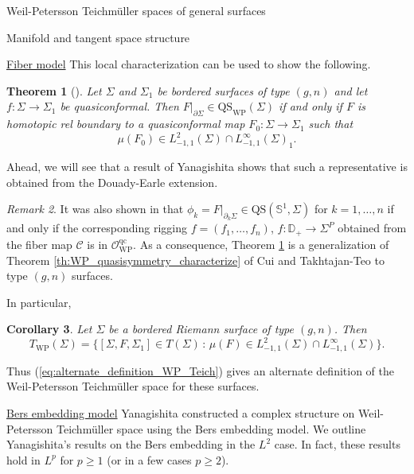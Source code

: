 \documentclass[12pt]{amsart}
\newcommand{\disk}{\ensuremath{\mathbb{D}} } %
\newcommand{\riem}{\Sigma}  %
\theoremstyle{plain}
\newtheorem{theorem}{Theorem}[section]
\newtheorem{corollary}[theorem]{Corollary}
\theoremstyle{definition}
\theoremstyle{remark}
\newtheorem{remark}[theorem]{Remark}
\numberwithin{equation}{section} %
\numberwithin{figure}{section} %
\begin{document}
\begin{section}{Weil-Petersson Teichm\"uller spaces of general surfaces}
\begin{subsection}{Manifold and tangent space structure}
\begin{subsubsection}{{\underline{Fiber model}}}
This local characterization can be used to show the following. 
\begin{theorem}[\cite{RSS_WP1}] \label{th:us_WP_homotopy_characterize}
 Let $\riem$ and $\riem_1$ be bordered surfaces of type $(g,n)$ and let $f:\riem \rightarrow \riem_1$ be quasiconformal.  Then $\left. F \right|_{\partial \riem} \in \mathrm{QS}_{\mathrm{WP}}(\riem)$ if and only if $F$ is homotopic rel boundary to a quasiconformal map $F_0:\riem \rightarrow \riem_1$ such that 
 \[ \mu(F_0) \in L^2_{-1,1}(\riem) \cap L^\infty_{-1,1}(\riem)_1. \]
\end{theorem}
Ahead, we will see that a result of Yanagishita shows that such a representative is obtained from the Douady-Earle extension.

\begin{remark} \label{re:Cuis_characterization_extended_us} It was also shown in \cite{RSS_WP_arxiv,RSS_WP2} that 
 $\phi_k = \left. F \right|_{\partial_k \riem} \in \mathrm{QS}(\mathbb{S}^1,\riem)$ for $k=1,\ldots,n$ if and only if the corresponding rigging $f = (f_1,\ldots,f_n)$, $f:\disk_+\rightarrow \riem^P$ obtained from the fiber map $\mathcal{C}$ is in $\mathcal{O}_{\mathrm{WP}}^{\mathrm{qc}}$. As a consequence, Theorem \ref{th:us_WP_homotopy_characterize} is a generalization of Theorem \ref{th:WP_quasisymmetry_characterize} of Cui and Takhtajan-Teo to type $(g,n)$ surfaces.  
\end{remark}

In particular, 
\begin{corollary} \cite{RSS_WP_arxiv,RSS_WP1} \label{co:WP_Teich_recharacterize_us}
 Let $\riem$ be a bordered Riemann surface of type $(g,n)$. Then
 \begin{equation} \label{eq:alternate_definition_WP_Teich}
  T_{\mathrm{WP}}(\riem) = \{ [\riem,F,\riem_1] \in T(\riem) \,:\, \mu(F) \in L^2_{-1,1}(\riem) \cap L^\infty_{-1,1}(\riem) \}. 
 \end{equation}
\end{corollary}
Thus (\ref{eq:alternate_definition_WP_Teich}) gives an alternate definition of the Weil-Petersson Teichm\"uller space for these surfaces. 


\end{subsubsection}
\begin{subsubsection}{{\underline{Bers embedding model}}}
 Yanagishita \cite{Yanagishita} constructed a complex structure on Weil-Petersson Teichm\"uller space using the Bers embedding model. 
 We outline Yanagishita's results on the Bers embedding in the $L^2$ case. In fact, these results hold in $L^p$ for $p \geq 1$ (or in a few cases $p \geq 2$). 
 

\end{subsubsection}
\end{subsection}
\end{section}
\end{document}
